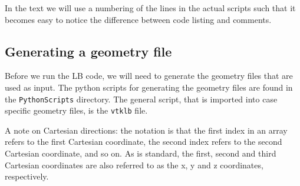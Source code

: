 \documentclass[11pt,a4paper]{report}
\begin{document}
In the text we will use a numbering of the lines in the actual scripts such that it becomes easy to notice the difference between code listing and comments.

\subsection{Generating a geometry file}\label{sec:generating a geometry}
Before we run the LB code, we will need to generate the geometry files that are used as input.  The python scripts for generating the geometry files are found in the \texttt{PythonScripts} directory. The general script, that is imported into case specific geometry files, is the \texttt{vtklb} file. 

A note on Cartesian directions: the notation is that the first index in an array refers to the first Cartesian coordinate, the second index refers to the second Cartesian coordinate, and so on.  As is standard, the first, second and third Cartesian coordinates are also referred to as the x, y and z coordinates, respectively. 
\end{document}
